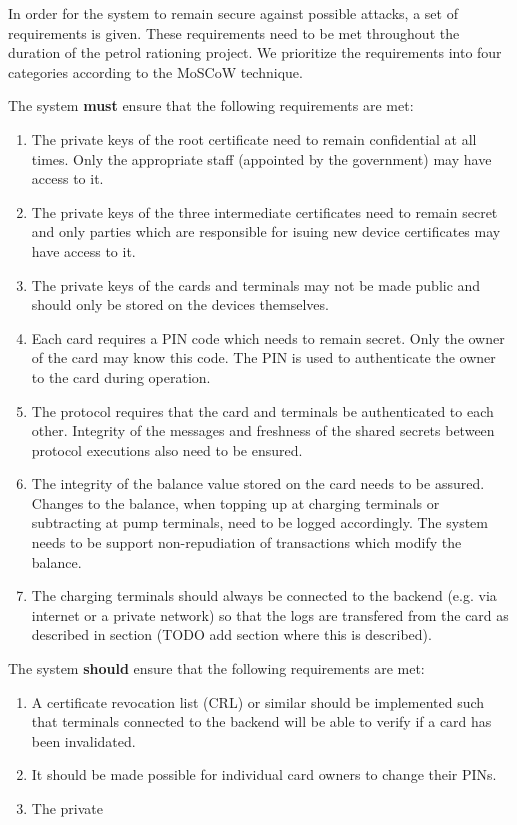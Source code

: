 In order for the system to remain secure against possible attacks, a set of requirements is given. These requirements need to be met throughout the duration of the petrol rationing project. We prioritize the requirements into four categories according to the MoSCoW technique.

The system {\bf must} ensure that the following requirements are met:
\begin{enumerate}
  \item The private keys of the root certificate need to remain confidential at all times. Only the appropriate staff (appointed by the government) may have access to it. 
  \item The private keys of the three intermediate certificates need to remain secret and only parties which are responsible for isuing new device certificates may have access to it.
  \item The private keys of the cards and terminals may not be made public and should only be stored on the devices themselves.
  \item Each card requires a PIN code which needs to remain secret. Only the owner of the card may know this code. The PIN is used to authenticate the owner to the card during operation.
  \item The protocol requires that the card and terminals be authenticated to each other. Integrity of the messages and freshness of the shared secrets between protocol executions also need to be ensured.
  \item The integrity of the balance value stored on the card needs to be assured. Changes to the balance, when topping up at charging terminals or subtracting at pump terminals, need to be logged accordingly. The system needs to be support non-repudiation of transactions which modify the balance.
  \item The charging terminals should always be connected to the backend (e.g. via internet or a private network) so that the logs are transfered from the card as described in section (TODO add section where this is described).
\end{enumerate}

The system {\bf should} ensure that the following requirements are met:
\begin{enumerate}
  \item A certificate revocation list (CRL) or similar should be implemented such that terminals connected to the backend will be able to verify if a card has been invalidated.
  \item It should be made possible for individual card owners to change their PINs.
  \item The private
\end{enumerate}

